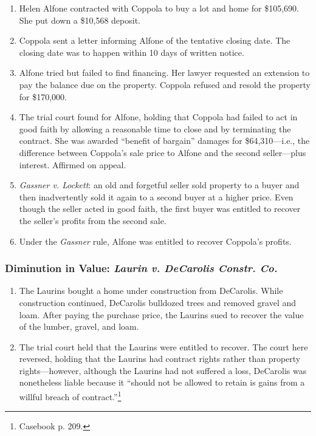 \begin{enumerate}
    \item Helen Alfone contracted with Coppola to buy a lot and home for 
    \$105,690. She put down a \$10,568 deposit.
    \item Coppola sent a letter informing Alfone of the tentative closing 
    date. The closing date was to happen within 10 days of written notice.
    \item Alfone tried but failed to find financing. Her lawyer requested an 
    extension to pay the balance due on the property. Coppola refused and 
    resold the property for \$170,000.
    \item The trial court found for Alfone, holding that Coppola had failed to 
    act in good faith by allowing a reasonable time to close and by 
    terminating the contract. She was awarded ``benefit of bargain'' damages 
    for \$64,310---i.e., the difference between Coppola's sale price to Alfone 
    and the second seller---plus interest. Affirmed on appeal. 
    \item \emph{Gassner v. Lockett}: an old and forgetful seller sold property 
    to a buyer and then inadvertently sold it again to a second buyer at a 
    higher price. Even though the seller acted in good faith, the first buyer 
    was entitled to recover the seller's profits from the second sale.
    \item Under the \emph{Gassner} rule, Alfone was entitled to recover 
    Coppola's profits.
\end{enumerate}

\subsubsection{Diminution in Value: \emph{Laurin v. DeCarolis Constr. Co.}}

\begin{enumerate}
    \item The Laurins bought a home under construction from DeCarolis. While 
    construction continued, DeCarolis bulldozed trees and removed gravel and 
    loam. After paying the purchase price, the Laurins sued to recover the 
    value of the lumber, gravel, and loam.
    \item The trial court held that the Laurins were entitled to recover. The 
    court here reversed, holding that the Laurins had contract rights rather 
    than property rights---however, although the Laurins had not suffered a 
    loss, DeCarolis was nonetheless liable because it ``should not be allowed 
    to retain is gains from a willful breach of contract.''\footnote{Casebook 
    p. 209.}
\end{enumerate}

